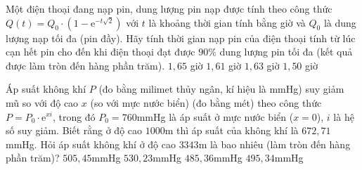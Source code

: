 \begin{ex}%
	Một điện thoại đang nạp pin, dung lượng pin nạp được tính theo công thức $Q(t)=Q_0\cdot(1-\mathrm{e}^{-t\sqrt2})$ với $t$ là khoảng thời gian tính bằng giờ và $Q_0$ là dung lượng nạp tối đa (pin đầy). Hãy tính thời gian nạp pin của điện thoại tính từ lúc cạn hết pin cho đến khi điện thoại đạt được $90\%$ dung lượng pin tối đa (kết quả được làm tròn đến hàng phần trăm).
	\choice
	{$1{,}65$ giờ}
	{$1{,}61$ giờ}
	{\True $1{,}63$ giờ}
	{$1{,}50$ giờ}
	
\end{ex}

\begin{ex}%
	Áp suất không khí $P$ (đo bằng milimet thủy ngân, kí hiệu là mmHg) suy giảm mũ so với độ cao $x$ (so với mực nước biển) (đo bằng mét) theo công thức $P=P_0 \cdot \mathrm{e}^{xi}$, trong đó $P_0=760$mmHg là áp suất ở mực nước biển ($x=0$), $i$ là hệ số suy giảm. Biết rằng ở độ cao $1000$m thì áp suất của không khí là $672,71$mmHg. Hỏi áp suất không khí ở độ cao $3343$m là bao nhiêu (làm tròn đến hàng phần trăm)?
	\choice
	{\True $505,45$mmHg}
	{$530,23$mmHg}
	{$485,36$mmHg}
	{$495,34$mmHg}
	
\end{ex}

